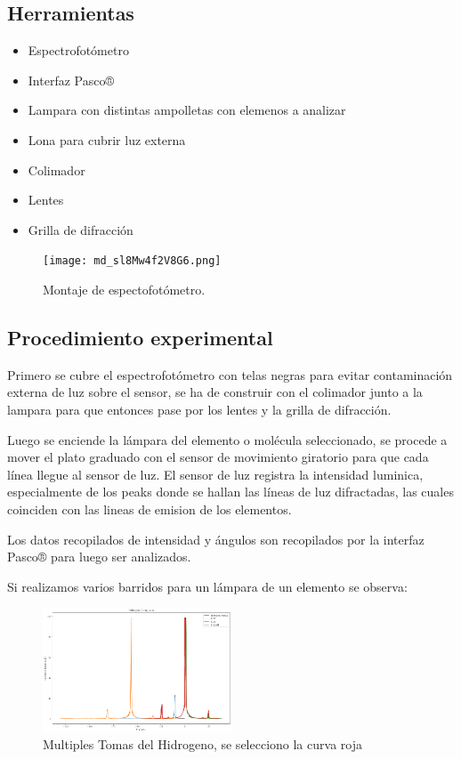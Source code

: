 \documentclass[a4paper,twocolumn,10pt]{article}
\begin{document}
\subsection{Herramientas}
\begin{itemize} 
\item Espectrofotómetro
\item Interfaz Pasco®
\item Lampara con distintas ampolletas con elemenos a analizar
\item Lona para cubrir luz externa
\item Colimador
\item Lentes
\item Grilla de difracción
\end{itemize}

\begin{figure}[H]
    \centering
    \texttt{[image: md\_sl8Mw4f2V8G6.png]}
    \caption{Montaje de espectofotómetro.}
    \label{fig:my_label}
\end{figure}

\subsection{Procedimiento experimental}
Primero se cubre el espectrofotómetro con telas negras para evitar contaminación externa de luz sobre el sensor, se ha de construir con el colimador junto a la lampara para que entonces pase por los lentes y la grilla de difracción.

Luego se enciende la lámpara del elemento o molécula seleccionado, se procede a mover el plato graduado con el sensor de movimiento giratorio para que cada línea llegue al sensor de luz. El sensor de luz registra la intensidad luminica, especialmente de los peaks donde se hallan las líneas de luz difractadas, las cuales coinciden con las lineas de emision de los elementos.

Los datos recopilados de intensidad y ángulos son recopilados por la interfaz Pasco® para luego ser analizados.

Si realizamos varios barridos para un lámpara de un elemento se observa:
\begin{figure}[H]
    \centering
    \includegraphics[width=0.5\textwidth]{Plots/HidrogenoCompilado.png}
    \caption{Multiples Tomas del Hidrogeno, se selecciono la curva roja}
    \label{fig:compund_hydrogen}
\end{figure}
\end{document}
